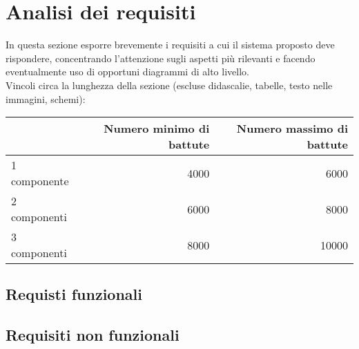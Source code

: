 \section{Analisi dei requisiti}

In questa sezione esporre brevemente i requisiti a cui il sistema proposto deve rispondere, concentrando l'attenzione sugli aspetti più rilevanti e facendo eventualmente uso di opportuni diagrammi di alto livello.\\

Vincoli circa la lunghezza della sezione (escluse didascalie, tabelle, testo nelle immagini, schemi):

\vspace{1cm}
\begin{tabular}{l|rr}
 & Numero minimo di battute & Numero massimo di battute \\
 \hline
 1 componente & 4000 & 6000 \\
 2 componenti & 6000 & 8000 \\
 3 componenti & 8000 & 10000 \\
 \hline
\end{tabular}

\subsection{Requisti funzionali}

\subsection{Requisiti non funzionali}
